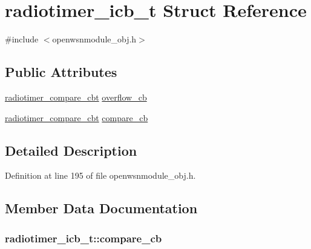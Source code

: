 \hypertarget{structradiotimer__icb__t}{}\section{radiotimer\+\_\+icb\+\_\+t Struct Reference}
\label{structradiotimer__icb__t}


{\ttfamily \#include $<$openwsnmodule\+\_\+obj.\+h$>$}

\subsection*{Public Attributes}
\begin{DoxyCompactItemize}
\item 
\hyperlink{group__radiotimer_ga62b602325e65023c91b784f20cd2d6bc}{radiotimer\+\_\+compare\+\_\+cbt} \hyperlink{structradiotimer__icb__t_ab4d3372f5885f14bd9635759c00ce457}{overflow\+\_\+cb}
\item 
\hyperlink{group__radiotimer_ga62b602325e65023c91b784f20cd2d6bc}{radiotimer\+\_\+compare\+\_\+cbt} \hyperlink{structradiotimer__icb__t_a7ee0225290d220bdd743f6404ef3f122}{compare\+\_\+cb}
\end{DoxyCompactItemize}


\subsection{Detailed Description}


Definition at line 195 of file openwsnmodule\+\_\+obj.\+h.



\subsection{Member Data Documentation}
\subsubsection[{\texorpdfstring{compare\+\_\+cb}{compare_cb}}]{ radiotimer\+\_\+icb\+\_\+t\+::compare\+\_\+cb}\hypertarget{structradiotimer__icb__t_a7ee0225290d220bdd743f6404ef3f122}{}\label{structradiotimer__icb__t_a7ee0225290d220bdd743f6404ef3f122}


